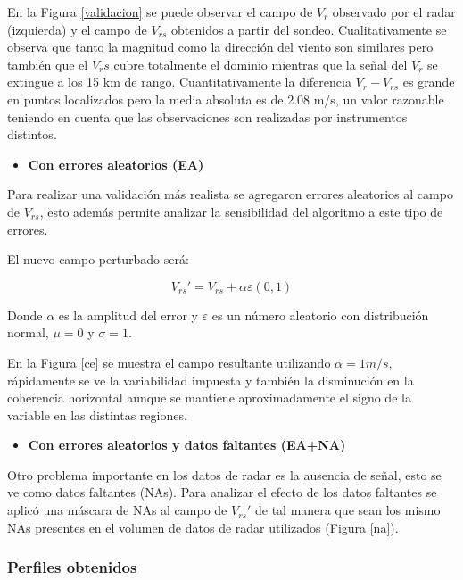 \documentclass[12pt,spanish,oneside]{book}
\providecommand{\tightlist}{%
  \setlength{\itemsep}{0pt}\setlength{\parskip}{0pt}}
\begin{document}
En la Figura \ref{validacion} se puede observar el campo de \(V_r\)
observado por el radar (izquierda) y el campo de \(V_{rs}\) obtenidos a
partir del sondeo. Cualitativamente se observa que tanto la magnitud
como la dirección del viento son similares pero también que el \(V_rs\)
cubre totalmente el dominio mientras que la señal del \(V_r\) se
extingue a los 15 km de rango. Cuantitativamente la diferencia
\(V_r - V_{rs}\) es grande en puntos localizados pero la media absoluta
es de 2.08 m/s, un valor razonable teniendo en cuenta que las
observaciones son realizadas por instrumentos distintos.

\begin{itemize}
\tightlist
\item
  \textbf{Con errores aleatorios (EA)}
\end{itemize}

Para realizar una validación más realista se agregaron errores
aleatorios al campo de \(V_{rs}\), esto además permite analizar la
sensibilidad del algoritmo a este tipo de errores.

El nuevo campo perturbado será:

\begin{equation} \label{eq-vr12}
V_{rs}'  = V_{rs} + \alpha \varepsilon(0,1)
\end{equation}

Donde \(\alpha\) es la amplitud del error y \(\varepsilon\) es un número
aleatorio con distribución normal, \(\mu = 0\) y \(\sigma= 1\).

En la Figura \ref{ce} se muestra el campo resultante utilizando
\(\alpha = 1 m/s\), rápidamente se ve la variabilidad impuesta y también
la disminución en la coherencia horizontal aunque se mantiene
aproximadamente el signo de la variable en las distintas regiones.

\begin{itemize}
\tightlist
\item
  \textbf{Con errores aleatorios y datos faltantes (EA+NA)}
\end{itemize}

Otro problema importante en los datos de radar es la ausencia de señal,
esto se ve como datos faltantes (NAs). Para analizar el efecto de los
datos faltantes se aplicó una máscara de NAs al campo de \(V_{rs}'\) de
tal manera que sean los mismo NAs presentes en el volumen de datos de
radar utilizados (Figura \ref{na}).

\subsubsection{Perfiles obtenidos}\label{perfiles-obtenidos}
\end{document}
